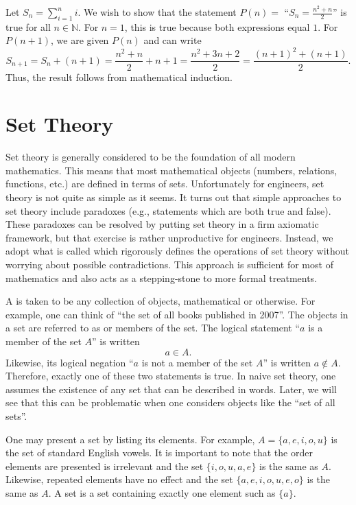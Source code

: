 \begin{example}
Let $S_n = \sum_{i=1}^n i$.
We wish to show that the statement $P(n)=$ ``$S_n = \frac{n^2 + n}{2}$'' is true for all $n\in \mathbb{N}$.
For $n=1$, this is true because both expressions equal $1$.
For $P(n+1)$, we are given $P(n)$ and can write
\[ S_{n+1} = S_n + (n+1) = \frac{n^2 + n}{2} + n+1 = \frac{n^2 + 3n + 2}{2} = \frac{(n+1)^2+(n+1)}{2}. \]
Thus, the result follows from mathematical induction.
\end{example}

\section{Set Theory}

Set theory is generally considered to be the foundation of all modern mathematics.
This means that most mathematical objects (numbers, relations, functions, etc.) are defined in terms of sets.
Unfortunately for engineers, set theory is not quite as simple as it seems.
It turns out that simple approaches to set theory include paradoxes (e.g., statements which are both true and false).
These paradoxes can be resolved by putting set theory in a firm axiomatic framework, but that exercise is rather unproductive for engineers.
Instead, we adopt what is called  which rigorously defines the operations of set theory without worrying about possible contradictions.
This approach is sufficient for most of mathematics and also acts as a stepping-stone to more formal treatments.

A  is taken to be any collection of objects, mathematical or otherwise.
For example, one can think of ``the set of all books published in 2007''.
The objects in a set are referred to as  or members of the set.
The logical statement ``$a$ is a member of the set $A$'' is written
\[ a \in A. \]
Likewise, its logical negation ``$a$ is not a member of the set $A$'' is written $a \notin A$.
Therefore, exactly one of these two statements is true.
In naive set theory, one assumes the existence of any set that can be described in words.
Later, we will see that this can be problematic when one considers objects like the ``set of all sets''.

One may present a set by listing its elements.
For example, $A= \{ a,e,i,o,u \}$ is the set of standard English vowels.
It is important to note that the order elements are presented is irrelevant and the set $\{ i,o,u,a,e \}$ is the same as $A$.
Likewise, repeated elements have no effect and the set $\{ a,e,i,o,u,e,o \}$ is the same as $A$.
A  set is a set containing exactly one element such as $\{a\}$.

